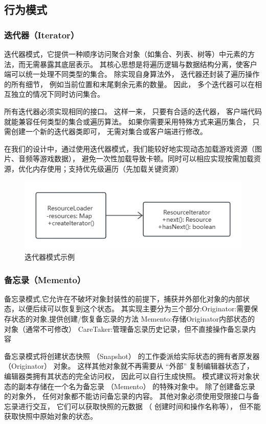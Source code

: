 \documentclass[12pt]{ctexart} %
\begin{document}
\subsection{行为模式}  
\subsubsection{迭代器（Iterator）} 
迭代器模式，它提供一种顺序访问聚合对象（如集合、列表、树等）中元素的方法，而无需暴露其底层表示。
其核心思想是将遍历逻辑与数据结构分离，使客户端可以统一处理不同类型的集合。
除实现自身算法外， 迭代器还封装了遍历操作的所有细节， 例如当前位置和末尾剩余元素的数量。 
因此， 多个迭代器可以在相互独立的情况下同时访问集合。

所有迭代器必须实现相同的接口。 这样一来， 只要有合适的迭代器， 客户端代码就能兼容任何类型的集合或遍历算法。 
如果你需要采用特殊方式来遍历集合， 只需创建一个新的迭代器类即可， 无需对集合或客户端进行修改。

在我们的设计中，通过使用迭代器模式，我们能较好地实现动态加载游戏资源（图片、音频等游戏数据），
避免一次性加载导致卡顿。同时可以相应实现按需加载资源，优化内存使用；支持优先级遍历（先加载关键资源）
\begin{figure}[H]
  \centering
  \includegraphics[width=1\textwidth]{diedai.png}
  \caption{迭代器模式示例}
\end{figure}
\subsubsection{备忘录（Memento）} 
备忘录模式,它允许在不破坏对象封装性的前提下，捕获并外部化对象的内部状态，以便后续可以恢复到这个状态。
其实现主要分为三个部分:Originator:需要保存状态的对象,提供创建/恢复备忘录的方法
Memento:存储Originator内部状态的对象（通常不可修改）
CareTaker:管理备忘录历史记录，但不直接操作备忘录内容

备忘录模式将创建状态快照 （Snapshot） 的工作委派给实际状态的拥有者原发器 （Originator） 对象。 
这样其他对象就不再需要从 “外部” 复制编辑器状态了， 编辑器类拥有其状态的完全访问权， 因此可以自行生成快照。
模式建议将对象状态的副本存储在一个名为备忘录 （Memento） 的特殊对象中。 
除了创建备忘录的对象外， 任何对象都不能访问备忘录的内容。 
其他对象必须使用受限接口与备忘录进行交互， 它们可以获取快照的元数据 （
创建时间和操作名称等）， 但不能获取快照中原始对象的状态。
\end{document}
